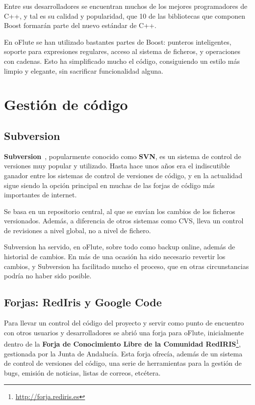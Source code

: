 Entre sus desarrolladores se encuentran muchos de los mejores programadores de
C++, y tal es su calidad y popularidad, que 10 de las bibliotecas que componen
Boost formarán parte del nuevo estándar de C++.

En oFlute se han utilizado bastantes partes de Boost: punteros inteligentes,
soporte para expresiones regulares, acceso al sistema de ficheros, y operaciones
con cadenas. Esto ha simplificado mucho el código, consiguiendo un estilo más
limpio y elegante, sin sacrificar funcionalidad alguna.

\section{Gestión de código}

\subsection{Subversion}
\textbf{Subversion}~\cite{refsubversion}, popularmente conocido como
\textbf{SVN}, es un sistema de control de versiones muy popular y
utilizado. Hasta hace unos años era el indiscutible ganador entre los sistemas
de control de versiones de código, y en la actualidad sigue siendo la opción
principal en muchas de las forjas de código más importantes de internet.

Se basa en un repositorio central, al que se envían los cambios de
los ficheros versionados. Además, a diferencia de otros sistemas como CVS, lleva
un control de revisiones a nivel global, no a nivel de fichero.

Subversion ha servido, en oFlute, sobre todo como backup online, además de
historial de cambios. En más de una ocasión ha sido necesario revertir los
cambios, y Subversion ha facilitado mucho el proceso, que en otras
circunstancias podría no haber sido posible.

\subsection{Forjas: RedIris y Google Code}
Para llevar un control del código del proyecto y servir como punto de encuentro
con otros usuarios y desarrolladores se abrió una forja para oFlute,
inicialmente dentro de la \textbf{Forja de Conocimiento Libre de la Comunidad
  RedIRIS}\footnote{\url{http://forja.rediris.es}}, gestionada por la Junta de
Andalucía. Esta forja ofrecía, además de un sistema de control de versiones del
código, una serie de herramientas para la gestión de bugs, emisión de noticias,
listas de correos, etcétera.

